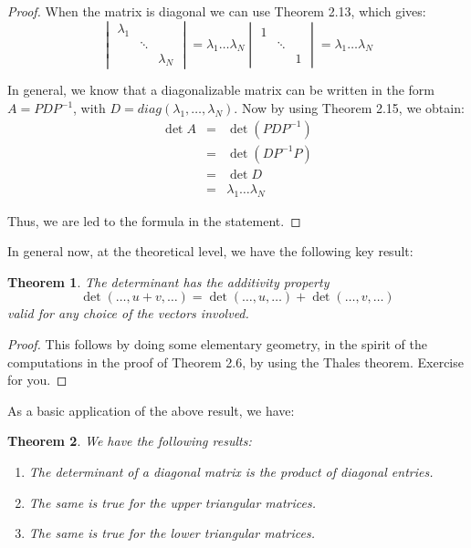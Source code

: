 \documentclass[12pt]{amsbook}
\newtheorem{theorem}{Theorem}[chapter]
\begin{document}
\begin{proof}
When the matrix is diagonal we can use Theorem 2.13, which gives:
$$\begin{vmatrix}
\lambda_1\\ 
&\ddots\\
&&\lambda_N\end{vmatrix}
=\lambda_1\ldots\lambda_N
\begin{vmatrix}
1\\ 
&\ddots\\
&&1\end{vmatrix}
=\lambda_1\ldots\lambda_N$$

In general, we know that a diagonalizable matrix can be written in the form $A=PDP^{-1}$, with $D=diag(\lambda_1,\ldots,\lambda_N)$. Now by using Theorem 2.15, we obtain:
\begin{eqnarray*}
\det A
&=&\det(PDP^{-1})\\
&=&\det(DP^{-1}P)\\
&=&\det D\\
&=&\lambda_1\ldots\lambda_N
\end{eqnarray*}

Thus, we are led to the formula in the statement.
\end{proof}

In general now, at the theoretical level, we have the following key result:

\begin{theorem}
The determinant has the additivity property
$$\det(\ldots,u+v,\ldots)
=\det(\ldots,u,\ldots)
+\det(\ldots,v,\ldots)$$
valid for any choice of the vectors involved.
\end{theorem}

\begin{proof}
This follows by doing some elementary geometry, in the spirit of the computations in the proof of Theorem 2.6, by using the Thales theorem. Exercise for you.
\end{proof}

As a basic application of the above result, we have:


\begin{theorem}
We have the following results:
\begin{enumerate}
\item The determinant of a diagonal matrix is the product of diagonal entries.

\item The same is true for the upper triangular matrices.

\item The same is true for the lower triangular matrices.
\end{enumerate}
\end{theorem}
\end{document}
